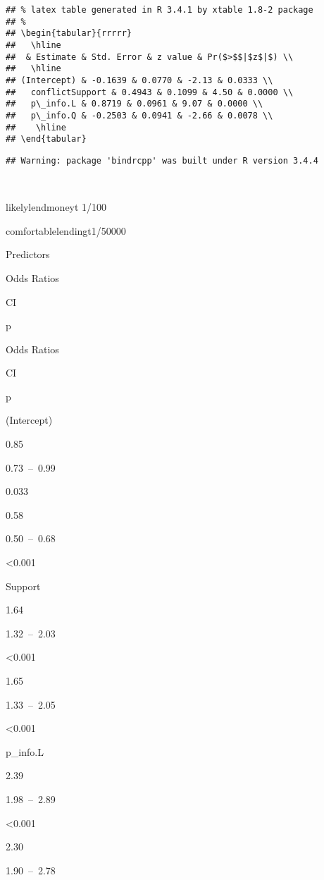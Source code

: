 \documentclass[]{article}
\begin{document}
\begin{verbatim}
## % latex table generated in R 3.4.1 by xtable 1.8-2 package
## % 
## \begin{tabular}{rrrrr}
##   \hline
##  & Estimate & Std. Error & z value & Pr($>$$|$z$|$) \\ 
##   \hline
## (Intercept) & -0.1639 & 0.0770 & -2.13 & 0.0333 \\ 
##   conflictSupport & 0.4943 & 0.1099 & 4.50 & 0.0000 \\ 
##   p\_info.L & 0.8719 & 0.0961 & 9.07 & 0.0000 \\ 
##   p\_info.Q & -0.2503 & 0.0941 & -2.66 & 0.0078 \\ 
##    \hline
## \end{tabular}
\end{verbatim}

\begin{verbatim}
## Warning: package 'bindrcpp' was built under R version 3.4.4
\end{verbatim}

~

likelylendmoneyt 1/100

comfortablelendingt1/50000

Predictors

Odds Ratios

CI

p

Odds Ratios

CI

p

(Intercept)

0.85

0.73~--~0.99

0.033

0.58

0.50~--~0.68

\textless{}0.001

Support

1.64

1.32~--~2.03

\textless{}0.001

1.65

1.33~--~2.05

\textless{}0.001

p\_info.L

2.39

1.98~--~2.89

\textless{}0.001

2.30

1.90~--~2.78
\end{document}
